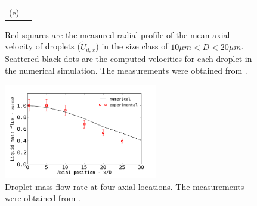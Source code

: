 \documentclass[preprint,12pt,review]{elsarticle}
\begin{document}
\begin{figure}[!htb]
\begin{tabular}{cc}
(e) & \\
\end{tabular}
 \caption{Red squares are the measured radial profile of the mean axial velocity of droplets ($\tilde{U}_{d,x}$) in the size class of $10\mu m <D<20\mu m$. Scattered black dots are the computed velocities for each droplet in the numerical simulation. The measurements were obtained from \citet{chen}.}
 \label{fig: Ux}
\end{figure}


\begin{figure}[!htb]
\centering
  \includegraphics[width=0.6\textwidth]{../thesis/figuras/chap5/massflow/drop_mflux.png}
\caption{Droplet mass flow rate at four axial locations. The measurements were obtained from \citet{chen}.}
\label{fig: droplet_flux}
\end{figure} 
\end{document}
